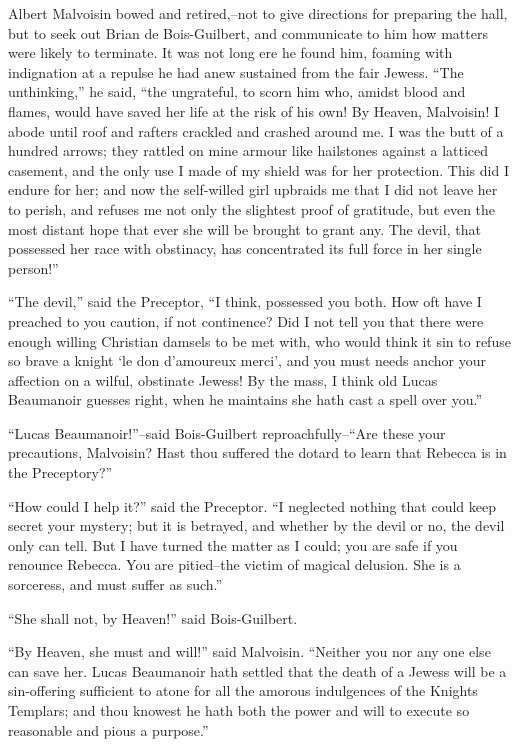 Albert Malvoisin bowed and retired,--not to give directions for
preparing the hall, but to seek out Brian de Bois-Guilbert, and
communicate to him how matters were likely to terminate. It was not long
ere he found him, foaming with indignation at a repulse he had anew
sustained from the fair Jewess. ``The unthinking,'' he said, ``the
ungrateful, to scorn him who, amidst blood and flames, would have saved
her life at the risk of his own! By Heaven, Malvoisin! I abode until
roof and rafters crackled and crashed around me. I was the butt of a
hundred arrows; they rattled on mine armour like hailstones against a
latticed casement, and the only use I made of my shield was for her
protection. This did I endure for her; and now the self-willed girl
upbraids me that I did not leave her to perish, and refuses me not only
the slightest proof of gratitude, but even the most distant hope that
ever she will be brought to grant any. The devil, that possessed her
race with obstinacy, has concentrated its full force in her single
person!''

``The devil,'' said the Preceptor, ``I think, possessed you both. How
oft have I preached to you caution, if not continence? Did I not tell
you that there were enough willing Christian damsels to be met with, who
would think it sin to refuse so brave a knight `le don d'amoureux
merci', and you must needs anchor your affection on a wilful, obstinate
Jewess! By the mass, I think old Lucas Beaumanoir guesses right, when he
maintains she hath cast a spell over you.''

``Lucas Beaumanoir!''--said Bois-Guilbert reproachfully--``Are these
your precautions, Malvoisin? Hast thou suffered the dotard to learn that
Rebecca is in the Preceptory?''

``How could I help it?'' said the Preceptor. ``I neglected nothing that
could keep secret your mystery; but it is betrayed, and whether by the
devil or no, the devil only can tell. But I have turned the matter as I
could; you are safe if you renounce Rebecca. You are pitied--the victim
of magical delusion. She is a sorceress, and must suffer as such.''

``She shall not, by Heaven!'' said Bois-Guilbert.

``By Heaven, she must and will!'' said Malvoisin. ``Neither you nor any
one else can save her. Lucas Beaumanoir hath settled that the death of a
Jewess will be a sin-offering sufficient to atone for all the amorous
indulgences of the Knights Templars; and thou knowest he hath both the
power and will to execute so reasonable and pious a purpose.''

